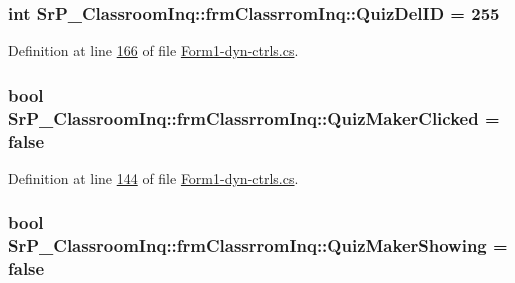 \hypertarget{class_sr_p___classroom_inq_1_1frm_classrrom_inq_a2221a860fdb3bc2837b3ca3c0cee182c}{
\subsubsection[{\-Quiz\-Del\-I\-D}]{\setlength{\rightskip}{0pt plus 5cm}int {\bf \-Sr\-P\-\_\-\-Classroom\-Inq\-::frm\-Classrrom\-Inq\-::\-Quiz\-Del\-I\-D} = 255}}
\label{class_sr_p___classroom_inq_1_1frm_classrrom_inq_a2221a860fdb3bc2837b3ca3c0cee182c}


\-Definition at line \hyperlink{_form1-dyn-ctrls_8cs_source_l00166}{166} of file \hyperlink{_form1-dyn-ctrls_8cs_source}{\-Form1-\/dyn-\/ctrls.\-cs}.

\hypertarget{class_sr_p___classroom_inq_1_1frm_classrrom_inq_a80b43512315939f073e08cfea00ce796}{
\subsubsection[{\-Quiz\-Maker\-Clicked}]{\setlength{\rightskip}{0pt plus 5cm}bool {\bf \-Sr\-P\-\_\-\-Classroom\-Inq\-::frm\-Classrrom\-Inq\-::\-Quiz\-Maker\-Clicked} = false}}
\label{class_sr_p___classroom_inq_1_1frm_classrrom_inq_a80b43512315939f073e08cfea00ce796}


\-Definition at line \hyperlink{_form1-dyn-ctrls_8cs_source_l00144}{144} of file \hyperlink{_form1-dyn-ctrls_8cs_source}{\-Form1-\/dyn-\/ctrls.\-cs}.

\hypertarget{class_sr_p___classroom_inq_1_1frm_classrrom_inq_a527e6e32ab67073ccbdb94297399ab2d}{
\subsubsection[{\-Quiz\-Maker\-Showing}]{\setlength{\rightskip}{0pt plus 5cm}bool {\bf \-Sr\-P\-\_\-\-Classroom\-Inq\-::frm\-Classrrom\-Inq\-::\-Quiz\-Maker\-Showing} = false}}
\label{class_sr_p___classroom_inq_1_1frm_classrrom_inq_a527e6e32ab67073ccbdb94297399ab2d}


